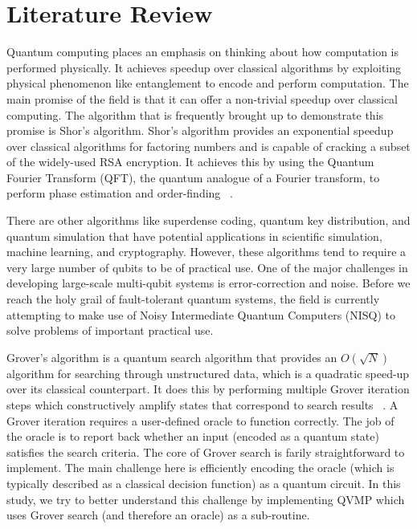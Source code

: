 \documentclass[11pt]{article}
\theoremstyle{definition}
\theoremstyle{remark}
\begin{document}
\section{Literature Review}


Quantum computing places an emphasis on thinking about how computation is
performed physically. It achieves speedup over classical algorithms by
exploiting physical phenomenon like entanglement to encode and perform
computation. The main promise of the field is that it can offer a non-trivial
speedup over classical computing. The algorithm that is frequently brought
up to demonstrate this promise is Shor’s algorithm. Shor’s
algorithm provides an exponential speedup over classical algorithms for
factoring numbers and is capable of cracking a subset of the widely-used RSA
encryption. It achieves this by using the Quantum Fourier Transform (QFT), the
quantum analogue of a Fourier transform, to perform phase estimation and
order-finding ~\cite{nielsen2000quantum}.

There are other algorithms like superdense coding, quantum key
distribution, and quantum simulation that have potential applications in
scientific simulation, machine learning, and cryptography. However, these
algorithms tend to require a very large number of qubits to be of practical use.
One of the major challenges in developing large-scale multi-qubit systems is
error-correction and noise. Before we reach the holy grail of  fault-tolerant
quantum systems, the field is currently attempting to make use of Noisy
Intermediate Quantum Computers (NISQ) to solve problems of important practical
use.

Grover's algorithm is a quantum search algorithm that provides an $O(\sqrt{N})$
algorithm for searching through unstructured data, which is a quadratic speed-up
over its classical counterpart. It does this by performing multiple Grover
iteration steps which constructively amplify states that correspond to search
results ~\cite{nielsen2000quantum}. A Grover iteration requires a user-defined
oracle to function correctly. The job of the oracle is to report back whether an
input (encoded as a quantum state) satisfies the search criteria. The core of
Grover search is farily straightforward to implement. The main challenge
here is efficiently encoding the oracle (which is typically described as
a classical decision function) as a quantum circuit. In this study, we try to
better understand this challenge by implementing QVMP which uses Grover search
(and therefore an oracle) as a sub-routine.
\end{document}
